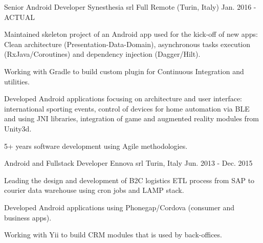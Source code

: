 


\begin{cventries}


\cventry
{Senior Android Developer} %
{Synesthesia srl} %
{Full Remote (Turin, Italy)} %
{Jan. 2016 - ACTUAL} %
{ %
	\begin{cvitems}
		\item {Maintained skeleton project of an Android app used for the kick-off of new apps: Clean architecture (Presentation-Data-Domain),   asynchronous tasks execution (RxJava/Coroutines) and dependency injection (Dagger/Hilt).}
		\item {Working with Gradle to build custom plugin for Continuous Integration and utilities.}
		\item {Developed Android applications focusing on architecture and user interface: international sporting events, control of devices for home automation via BLE and using JNI libraries, integration of game and augmented reality modules from Unity3d.}
		\item {5+ years software development using Agile methodologies. }
	\end{cvitems}
}


\cventry
{Android and Fullstack Developer} %
{Ennova srl} %
{Turin, Italy} %
{Jun. 2013 - Dec. 2015} %
{ %
	\begin{cvitems}
		\item {Leading the design and development of B2C logistics ETL process from SAP to courier data warehouse using cron jobs and LAMP stack.}
		\item {Developed Android applications using Phonegap/Cordova (consumer and business apps).}
		\item {Working with Yii to build CRM modules that is used by back-offices.}
	\end{cvitems}
}

\end{cventries}